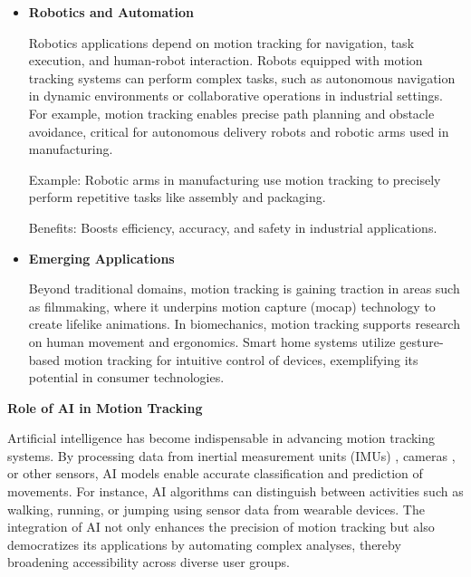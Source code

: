 \begin{itemize}
    The gaming industry and immersive technologies like VR and AR heavily rely on motion tracking to provide intuitive and engaging user experiences. Full-body motion tracking systems, including motion controllers and VR suits, allow users to interact seamlessly with virtual environments. In AR, motion tracking aligns virtual objects with real-world movements, enabling applications in education, entertainment, and remote collaboration. These innovations contribute to the growing demand for lifelike and interactive digital experiences.
    
    Example: Motion controllers in gaming consoles like the PlayStation VR track hand and body movements to provide realistic gameplay experiences.
    
    Impact: Facilitates more natural user interactions and expands applications to virtual training and simulations.

    \item \textbf{Robotics and Automation}
    
    Robotics applications depend on motion tracking for navigation, task execution, and human-robot interaction. Robots equipped with motion tracking systems can perform complex tasks, such as autonomous navigation in dynamic environments or collaborative operations in industrial settings. For example, motion tracking enables precise path planning and obstacle avoidance, critical for autonomous delivery robots and robotic arms used in manufacturing.
    
    Example: Robotic arms in manufacturing use motion tracking to precisely perform repetitive tasks like assembly and packaging.
    
    Benefits: Boosts efficiency, accuracy, and safety in industrial applications.

    \item \textbf{Emerging Applications}
    
    Beyond traditional domains, motion tracking is gaining traction in areas such as filmmaking, where it underpins motion capture (mocap) technology to create lifelike animations. In biomechanics, motion tracking supports research on human movement and ergonomics. Smart home systems utilize gesture-based motion tracking for intuitive control of devices, exemplifying its potential in consumer technologies.
\end{itemize}

\textbf{Role of AI in Motion Tracking}

Artificial intelligence has become indispensable in advancing motion tracking systems. By processing data from inertial measurement units (IMUs) \cite{article:motion_tracking_IMU_upper_limb}, cameras \cite{article:motion_tracking_using_vision}, or other sensors, AI models enable accurate classification and prediction of movements. For instance, AI algorithms can distinguish between activities such as walking, running, or jumping using sensor data from wearable devices. The integration of AI not only enhances the precision of motion tracking but also democratizes its applications by automating complex analyses, thereby broadening accessibility across diverse user groups.


